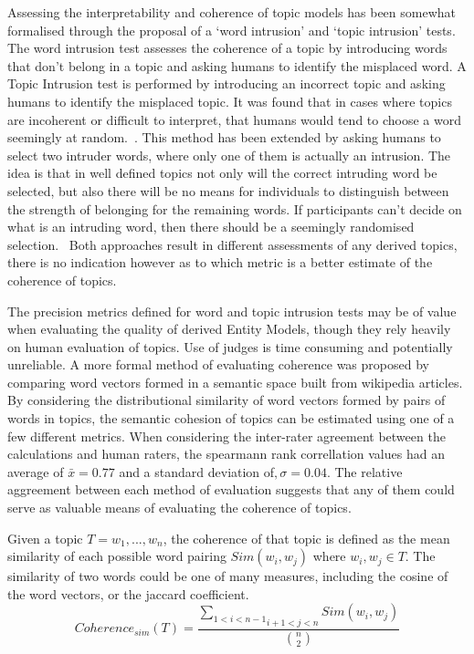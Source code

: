 \documentclass[10pt]{report}
\begin{document}
Assessing the interpretability and coherence of topic models has been somewhat formalised through the proposal of a ‘word intrusion’ and ‘topic intrusion’ tests. The word intrusion test assesses the coherence of a topic by introducing words that don’t belong in a topic and asking humans to identify the misplaced word. A Topic Intrusion test is performed by introducing an incorrect topic and asking humans to identify the misplaced topic. It was found that in cases where topics are incoherent or difficult to interpret, that humans would tend to choose a word seemingly at random.~\cite{Chang2009-jr}. This method has been extended by asking humans to select two intruder words, where only one of them is actually an intrusion. The idea is that in well defined topics not only will the correct intruding word be selected, but also there will be no means for individuals to distinguish between the strength of belonging for the remaining words. If participants can't decide on what is an intruding word, then there should be a seemingly randomised selection.~\cite{Morstatter2016-co} Both approaches result in different assessments of any derived topics, there is no indication however as to which metric is a better estimate of the coherence of topics.

The precision metrics defined for word and topic intrusion tests may be of value when evaluating the quality of derived Entity Models, though they rely heavily on human evaluation of topics. Use of judges is time consuming and potentially unreliable. A more formal method of evaluating coherence was proposed by comparing word vectors formed in a semantic space built from wikipedia articles. By considering the distributional similarity of word vectors formed by pairs of words in topics, the semantic cohesion of topics can be estimated using one of a few different metrics. When considering the inter-rater agreement between the calculations and human raters, the spearmann rank correllation values had an average of  \(\bar{x}=0.77\) and a standard deviation of\(,\sigma=0.04\). The relative aggreement between each method of evaluation suggests that any of them could serve as valuable means of evaluating the coherence of topics. ~\cite{Aletras2013-oo}

Given a topic \(T = {w_1,...,w_n}\), the coherence of that topic is defined as the mean similarity of each possible word pairing \(Sim(w_i, w_j)\) where \(w_i, w_j \in T\). The similarity of two words could be one of many measures, including the cosine of the word vectors, or the jaccard coefficient.~\cite{Newman2010-op}
\[
  Coherence_{sim}(T)=\frac{\underset{i+1<j<n}{\underset{1<i<n-1}{\sum}}Sim(w_i, w_j)}{{n \choose 2}}
\]
%
\end{document}
